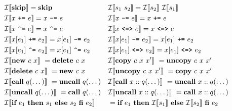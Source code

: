 \begin{figure}[ht]
    \begin{align*}
        &\mathcal{I}\llbracket \textbf{skip} \rrbracket = \textbf{skip} &&\mathcal{I}\llbracket s_1\ s_2 \rrbracket = \mathcal{I}\llbracket s_2 \rrbracket\ \mathcal{I}\llbracket s_1 \rrbracket\\
        &\mathcal{I}\llbracket x\ \texttt{\textbf{+=}}\ e \rrbracket = x\ \texttt{\textbf{-=}}\ e &&\mathcal{I}\llbracket x\ \texttt{\textbf{-=}}\ e \rrbracket = x\ \texttt{\textbf{+=}}\ e\\
        &\mathcal{I}\llbracket x\ \texttt{\textbf{\textasciicircum=}}\ e \rrbracket = x\ \texttt{\textbf{\textasciicircum=}}\ e &&\mathcal{I}\llbracket x\ \texttt{\textbf{<=>}}\ e \rrbracket = x\ \texttt{\textbf{<=>}}\ e\\
        &\mathcal{I}\llbracket x[e_1]\ \texttt{\textbf{+=}}\ e_2 \rrbracket = x[e_1]\ \texttt{\textbf{-=}}\ e_2 &&\mathcal{I}\llbracket x[e_1]\ \texttt{\textbf{-=}}\ e_2 \rrbracket = x[e_1]\ \texttt{\textbf{+=}}\ e_2\\
        &\mathcal{I}\llbracket x[e_1]\ \texttt{\textbf{\textasciicircum=}}\ e_2 \rrbracket = x[e_1]\ \texttt{\textbf{\textasciicircum=}}\ e_2 &&\mathcal{I}\llbracket x[e_1]\ \texttt{\textbf{<=>}}\ e_2 \rrbracket = x[e_1]\ \texttt{\textbf{<=>}}\ e_2\\
        &\mathcal{I} \llbracket \textbf{new}\ c\ x\rrbracket\ = \textbf{delete}\ c\ x  &&\mathcal{I} \llbracket \textbf{copy}\ c\ x\ x' \rrbracket\ = \textbf{uncopy}\ c\ x\ x'\\
        &\mathcal{I} \llbracket \textbf{delete}\ c\ x \rrbracket\ = \textbf{new}\ c\ x  &&\mathcal{I} \llbracket \textbf{uncopy}\ c\ x\ x' \rrbracket\ = \textbf{copy}\ c\ x\ x'\\
        &\mathcal{I} \llbracket \textbf{call}\ q(\dots) \rrbracket\ = \textbf{uncall}\ q(\dots) &&\mathcal{I} \llbracket \textbf{call}\ x::q(\dots) \rrbracket\ = \textbf{uncall}\ x::q(\dots)\\
        &\mathcal{I} \llbracket \textbf{uncall}\ q(\dots) \rrbracket\ = \textbf{call}\ q(\dots) &&\mathcal{I} \llbracket \textbf{uncall}\ x::q(\dots) \rrbracket\ = \textbf{call}\ x::q(\dots)\\
        &\mathcal{I} \llbracket \textbf{if}\ e_1\ \textbf{then}\ s_1\ \textbf{else}\ s_2\ \textbf{fi}\ e_2 \rrbracket &&= \textbf{if}\ e_1\ \textbf{then}\ \mathcal{I}\llbracket s_1 \rrbracket\ \textbf{else}\ \mathcal{I}\llbracket s_2 \rrbracket\ \textbf{fi}\ e_2\\

\end{align*}
\end{figure}
